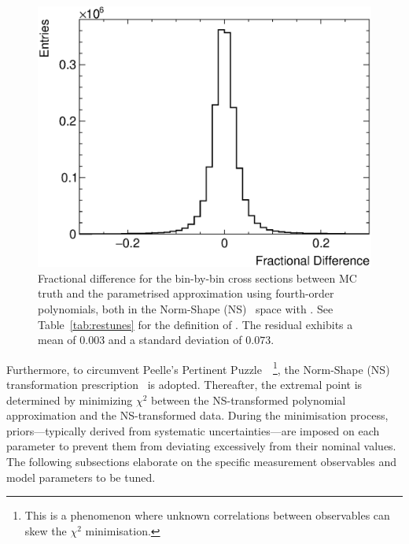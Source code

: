\begin{figure}[!htb] 	
    \centering 		
    \includegraphics[width=\sgfigwid\textwidth]{figures/tuning/residual.eps}
    \caption{\label{fig:residual} Fractional difference for the bin-by-bin cross sections between MC truth and the parametrised approximation using fourth-order polynomials, both in the Norm-Shape (NS)~\cite{DAgostini:1993arp,Hanson:2005mrg} space with \allpar. See Table~\ref{tab:restunes} for the definition of \allpar. The residual exhibits a mean of $0.003$ and a standard deviation of $0.073$.} 
\end{figure}

Furthermore, to circumvent Peelle's Pertinent Puzzle~\cite{PPP_FNL,Chakrani:2023htw}~\footnote{This is a phenomenon where unknown correlations between observables can skew the $\chi^2$ minimisation.}, the Norm-Shape (NS) transformation prescription~\cite{DAgostini:1993arp,Hanson:2005mrg} is adopted. 
Thereafter, the extremal point is determined by minimizing $\chi^2$ between the NS-transformed polynomial approximation and the NS-transformed data. 
During the minimisation process, priors—typically derived from systematic uncertainties—are imposed on each parameter to prevent them from deviating excessively from their nominal values. 
The following subsections elaborate on the specific measurement observables and model parameters to be tuned.

